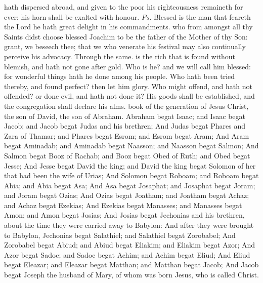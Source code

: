\introit
{} hath dispersed abroad, and given to the poor his righteousness remaineth for ever: his horn shall be exalted with honour. \textit{Ps.} Blessed is the man that feareth the Lord he hath great delight in his commandments.
\collect
{} who from amongst all thy Saints didst choose blessed Joachim to be the father of the Mother of thy Son: grant, we beseech thee; that we who venerate his festival may also continually perceive his advocacy. Through the same.
 is the rich that is found without blemish, and hath not gone after gold. Who is he? and we will call him blessed: for wonderful things hath he done among his people. Who hath been tried thereby, and found perfect? then let him glory. Who might offend, and hath not offended? or done evil, and hath not done it? His goods shall be established, and the congregation shall declare his alms.
 book of the generation of Jesus Christ, the son of David, the son of Abraham. Abraham begat Isaac; and Isaac begat Jacob; and Jacob begat Judas and his brethren; And Judas begat Phares and Zara of Thamar; and Phares begat Esrom; and Esrom begat Aram; And Aram begat Aminadab; and Aminadab begat Naasson; and Naasson begat Salmon; And Salmon begat Booz of Rachab; and Booz begat Obed of Ruth; and Obed begat Jesse; And Jesse begat David the king; and David the king begat Solomon of her that had been the wife of Urias; And Solomon begat Roboam; and Roboam begat Abia; and Abia begat Asa; And Asa begat Josaphat; and Josaphat begat Joram; and Joram begat Ozias; And Ozias begat Joatham; and Joatham begat Achaz; and Achaz begat Ezekias; And Ezekias begat Manasses; and Manasses begat Amon; and Amon begat Josias; And Josias begat Jechonias and his brethren, about the time they were carried away to Babylon: And after they were brought to Babylon, Jechonias begat Salathiel; and Salathiel begat Zorobabel; And Zorobabel begat Abiud; and Abiud begat Eliakim; and Eliakim begat Azor; And Azor begat Sadoc; and Sadoc begat Achim; and Achim begat Eliud; And Eliud begat Eleazar; and Eleazar begat Matthan; and Matthan begat Jacob; And Jacob begat Joseph the husband of Mary, of whom was born Jesus, who is called Christ.
